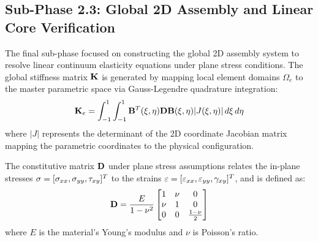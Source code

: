 \subsection{Sub-Phase 2.3: Global 2D Assembly and Linear Core Verification}
\label{subsec:solver_validation}

The final sub-phase focused on constructing the global 2D assembly system to resolve linear continuum elasticity equations under plane stress conditions. The global stiffness matrix $\mathbf{K}$ is generated by mapping local element domains $\Omega_e$ to the master parametric space via Gauss-Legendre quadrature integration:
\begin{equation}
        \mathbf{K}_e = \int_{-1}^{1} \int_{-1}^{1} \mathbf{B}^T(\xi, \eta) \mathbf{D} \mathbf{B}(\xi, \eta) |J(\xi, \eta)| \, d\xi \, d\eta
\end{equation}
where $|J|$ represents the determinant of the 2D coordinate Jacobian matrix mapping the parametric coordinates to the physical configuration.

The constitutive matrix $\mathbf{D}$ under plane stress assumptions relates the in-plane stresses $\mathbf{\sigma} = [\sigma_{xx}, \sigma_{yy}, \tau_{xy}]^T$ to the strains $\mathbf{\varepsilon} = [\varepsilon_{xx}, \varepsilon_{yy}, \gamma_{xy}]^T$, and is defined as:
\begin{equation}
        \mathbf{D} = \frac{E}{1 - \nu^2} \begin{bmatrix} 1 & \nu & 0 \\ \nu & 1 & 0 \\ 0 & 0 & \frac{1 - \nu}{2} \end{bmatrix}
\end{equation}
where $E$ is the material's Young's modulus and $\nu$ is Poisson's ratio.

